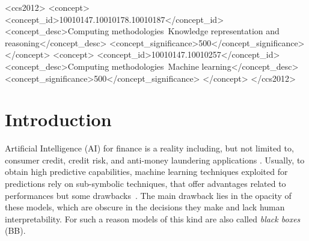 \documentclass[sigconf]{acmart}
\begin{document}
\begin{CCSXML}
	<ccs2012>
	<concept>
	<concept_id>10010147.10010178.10010187</concept_id>
	<concept_desc>Computing methodologies~Knowledge representation and reasoning</concept_desc>
	<concept_significance>500</concept_significance>
	</concept>
	<concept>
	<concept_id>10010147.10010257</concept_id>
	<concept_desc>Computing methodologies~Machine learning</concept_desc>
	<concept_significance>500</concept_significance>
	</concept>
	</ccs2012>
\end{CCSXML}



\maketitle

\section{Introduction}

Artificial Intelligence (AI) for finance is a reality including, but not limited to, consumer credit, credit risk, and anti-money laundering applications \cite{aziz2019machine}. 
%
Usually, to obtain high predictive capabilities, machine learning techniques exploited for predictions rely on sub-symbolic techniques, that offer advantages related to performances but some drawbacks~\cite{rocha2012far}.
%
The main drawback lies in the opacity of these models, which are obscure in the decisions they make and lack human interpretability.
%
For such a reason models of this kind are also called \emph{black boxes} (BB).
\end{document}
